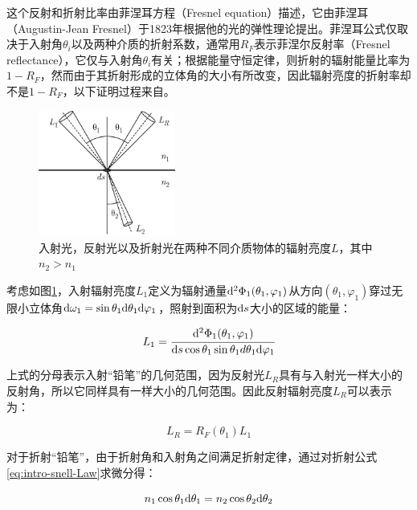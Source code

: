 这个反射和折射比率由菲涅耳方程（Fresnel equation）描述，它由菲涅耳（Augustin-Jean Fresnel）于1823年根据他的光的弹性理论提出。菲涅耳公式仅取决于入射角$\theta_i$以及两种介质的折射系数，通常用$R_F$表示菲涅尔反射率（Fresnel reflectance），它仅与入射角$\theta_i$有关；根据能量守恒定律，则折射的辐射能量比率为$1-R_F$，然而由于其折射形成的立体角的大小有所改变，因此辐射亮度的折射率却不是$1-R_F$，以下证明过程来自\cite{a:ReflectionandtransmissionoflightbyaflatinterfaceFresnelsformulae}。

\begin{figure}
	\sidecaption
	\includegraphics[width=0.4\textwidth]{figures/intro/fresnel}
	\caption{入射光，反射光以及折射光在两种不同介质物体的辐射亮度$L$，其中$n_2>n_1$}
	\label{f:intro-fresnel}
\end{figure}

考虑如图\ref{f:intro-fresnel}，入射辐射亮度$L_1$定义为辐射通量${\rm d}^{2}\Phi_1(\theta_1,\varphi_1)$从方向$(\theta_1,\varphi_1)$穿过无限小立体角${\rm d}\omega_1=\sin\theta_1 {\rm d}\theta_1 {\rm d}\varphi_1$，照射到面积为${\rm d}s$大小的区域的能量：

\begin{equation}
	L_1= \cfrac{{\rm d}^{2}\Phi_1(\theta_1,\varphi_1)}{{\rm d}s\cos\theta_1 \sin\theta_1 d\theta_1 {\rm d}\varphi_1}
\end{equation}

\noindent 上式的分母表示入射“铅笔”的几何范围，因为反射光$L_R$具有与入射光一样大小的反射角，所以它同样具有一样大小的几何范围。因此反射辐射亮度$L_R$可以表示为：

 \begin{equation}
 	L_R=R_F(\theta_1)L_1
 \end{equation}

\noindent 对于折射“铅笔”，由于折射角和入射角之间满足折射定律，通过对折射公式\ref{eq:intro-snell-Law}求微分得：

\begin{equation}\label{eq:intro-snell-Law-diff}
	n_1 \cos\theta_1 {\rm d}\theta_1=n_2 \cos\theta_2 {\rm d}\theta_2
\end{equation}

